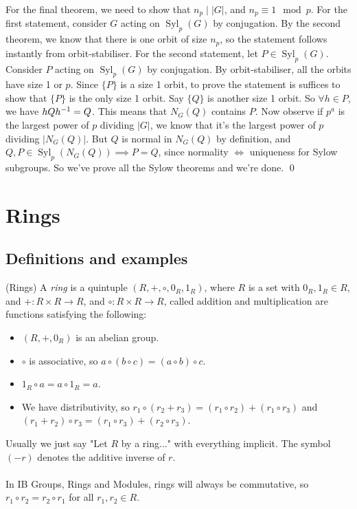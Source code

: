 \documentclass{article}
\DeclareMathOperator{\syl}{Syl}
\begin{document}
\begin{itemize}
For the final theorem, we need to show that $ n_p\mid |G| $, and $ n_p\equiv 1\mod p $. For the first statement, consider $ G $ acting on $ \syl_p(G) $ by conjugation. By the second theorem, we know that there is one orbit of size $ n_p $, so the statement follows instantly from orbit-stabiliser. For the second statement, let $ P\in \syl_p(G) $. Consider $ P $ acting on $ \syl_p(G) $ by conjugation. By orbit-stabiliser, all the orbits have size 1 or $ p $. Since $ \{P\} $ is a size 1 orbit, to prove the statement is suffices to show that $ \{P\} $ is the only size 1 orbit. Say $ \{Q\} $ is another size 1 orbit. So $ \forall h\in P $, we have $ hQ{h}^{-1}=Q $. This means that $ N_G(Q) $ contains $ P $. Now observe if $ p^a $ is the largest power of $ p $ dividing $ |G| $, we know that it's the largest power of $ p $ dividing $ |N_G(Q)| $. But $ Q $ is normal in $ N_G(Q) $ by definition, and $ Q,P\in \syl_p(N_G(Q))\implies P=Q $, since normality $ \iff $ uniqueness for Sylow subgroups. So we've prove all the Sylow theorems and we're done. \qed
\newpage
\section{Rings}
\subsection{Definitions and examples}
\begin{definition}
	(Rings) A \textit{ring} is a quintuple $ (R,+,\circ,0_R,1_R) $, where $ R $ is a set with $ 0_R,1_R\in R $, and $ +:R\times R\to R $, and $ \circ:R\times R\to R $, called addition and multiplication are functions satisfying the following:
	\begin{itemize}
		\item $ (R,+,0_R) $ is an abelian group.
		\item $ \circ $ is associative, so $ a\circ(b\circ c)=(a\circ b)\circ c $.
		\item $ 1_R\circ a = a\circ 1_R=a $.
		\item We have distributivity, so $ r_1\circ (r_2+r_3)=(r_1\circ r_2)+(r_1\circ r_3) $ and $ (r_1+r_2)\circ r_3=(r_1\circ r_3)+(r_2\circ r_3) $.
	\end{itemize}
\end{definition}

Usually we just say "Let $ R $ by a ring..." with everything implicit. The symbol $ (-r) $ denotes the additive inverse of $ r $.\\\\
In IB Groups, Rings and Modules, rings will always be commutative, so $ r_1\circ r_2=r_2\circ r_1 $ for all $ r_1,r_2\in R $.


\end{itemize}
\end{document}
